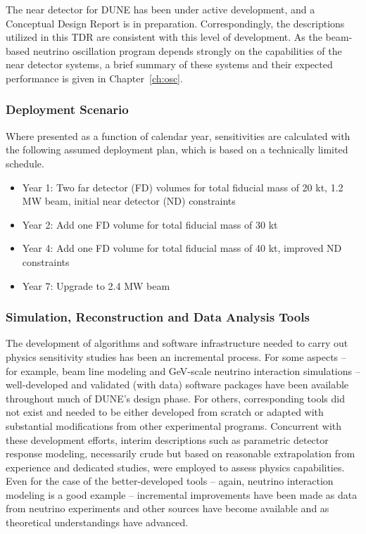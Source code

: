 The near detector for DUNE has been under active development,
and a Conceptual Design Report is in preparation.
Correspondingly, the descriptions utilized in this TDR
are consistent with this level of development.  As the
beam-based neutrino oscillation program depends strongly
on the capabilities of the near detector systems, a brief
summary of these systems and their expected performance is
given in Chapter~\ref{ch:osc}.

\subsubsection{Deployment Scenario}
\label{sec:exec-assm-meth-deployment}

Where presented as a function of calendar year,
sensitivities are calculated with the following
assumed deployment plan, which is based on a
technically limited schedule.
\begin{itemize}
    \item Year 1: Two far detector (FD) volumes for total
          fiducial mass of 20 kt, 1.2 MW beam,
          initial near detector (ND) constraints
    \item Year 2: Add one FD volume for total fiducial mass of 30 kt
    \item Year 4: Add one FD volume for total fiducial mass of 40 kt,
          improved ND constraints
    \item Year 7: Upgrade to 2.4 MW beam
\end{itemize}


\subsubsection{Simulation, Reconstruction and Data Analysis Tools}
\label{sec:exec-assm-meth-simreco}

The development of algorithms and software infrastructure needed
to carry out physics sensitivity studies has been an incremental
process.  For some aspects -- for example, beam line modeling
and GeV-scale neutrino interaction simulations --
well-developed and validated (with data) software packages have
been available throughout much of DUNE's design phase.
For others, corresponding tools did not exist and needed to be
either developed from scratch or adapted with substantial
modifications from other experimental programs.  Concurrent
with these development efforts, interim descriptions such
as parametric detector response modeling, necessarily crude
but based on reasonable extrapolation from experience and
dedicated studies, were employed to assess physics capabilities.
Even for the case of the better-developed tools -- again,
neutrino interaction modeling is a good example -- incremental
improvements have been made as data from neutrino experiments
and other sources have become available and as theoretical
understandings have advanced.

